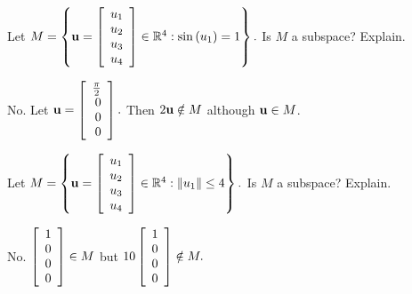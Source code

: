 \begin{enumialphparenastyle}
\begin{ex} Let $M=\left\{ {\bf u}=\left[ 
\begin{array}{c}
u_{1} \\
u_{2} \\
u_{3} \\
u_{4}
\end{array}
\right] \in 
\mathbb{R}^{4}:\sin \left( u_{1}\right) =1\right\} .$ Is $M$ a subspace?
Explain.
\begin{sol}
No. Let ${\bf u}=\left[ \begin{array}{r}
\frac{\pi }{2} \\
0 \\
0 \\
0
\end{array}
\right] .$ Then $2{\bf u}\notin M$ although ${\bf u}\in M$.
\end{sol}
\end{ex}

\begin{ex} Let $M=\left\{ {\bf u}=\left[ \begin{array}{c}
u_{1} \\
u_{2} \\
u_{3} \\
u_{4}
\end{array}\right] \in 
\mathbb{R}^{4}:\| u_{1}\| \leq 4\right\} .$ Is $M$ a
subspace? Explain.
\begin{sol}
No. $\left[
\begin{array}{r}
1 \\
0 \\
0 \\
0
\end{array}
\right] \in M$ but $10\left[ \begin{array}{r}
1 \\
0 \\
0 \\
0
\end{array}
\right] \notin M.$
\end{sol}
\end{ex}


\end{enumialphparenastyle}
